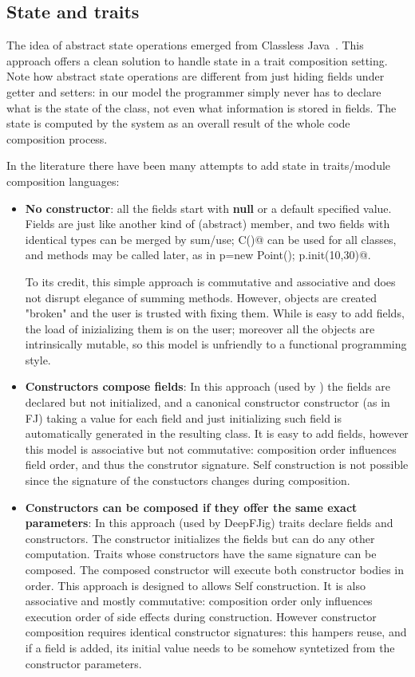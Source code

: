 \subsection{State and traits}

The idea of abstract state operations emerged from Classless
Java~\cite{wang2016classless}. This approach offers a clean solution to handle state
in a trait composition setting.
Note how abstract state operations are different from just hiding fields under getter and setters: 
in our model the programmer simply never has to declare what is the state of the class, not even what information is stored in fields.
The state is computed by the system as an overall result of the whole code composition process.

In the literature there have been many attempts to add state in traits/module composition languages:
\begin{itemize}  
\item {\bf No constructor}: all the fields start with {\bf null} or a default specified value.
  Fields are just like another kind of (abstract) member, and two fields
  with identical types can be merged by sum/use; \Q@new C()@ can be used for all classes, and \Q@init@ methods may be called later, as in
  \Q@Point p=new Point(); p.init(10,30)@.
  
  To its credit, this simple approach is commutative and associative and does not disrupt elegance of summing methods.
  However, objects are created "broken" and the user is trusted with fixing them.
  While is easy to add fields, the load of inizializing them is on the user; moreover
    all the objects are intrinsically mutable, so this model is unfriendly
    to a functional programming style.
\item {\bf Constructors compose fields}:
In this approach (used by \cite{fjig}) the fields are declared but not initialized, and
a canonical constructor constructor (as in FJ) taking a value for each field and just initializing such field
is automatically generated in the resulting class.
It is easy to add fields, however this model is associative but not commutative: composition order influences field order, and thus the construtor signature.
Self construction is not possible 
since the signature of the constuctors changes during composition.

\item {\bf Constructors can be composed if they offer the same exact parameters}:
In this approach (used by DeepFJig) traits declare fields and constructors.
The constructor initializes the fields but can do any other computation.
Traits whose constructors have the same signature can be composed.
The composed constructor will execute both constructor bodies in order.
This approach is designed to allows Self construction.
It is also associative and mostly commutative: composition order only influences execution order of side effects during construction.
However constructor composition requires identical constructor signatures: this
hampers reuse, and if a field is added, its initial value needs to be
somehow syntetized from the constructor parameters.

\end{itemize}

